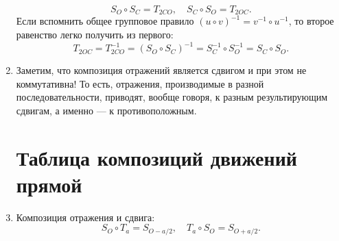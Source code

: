\begin{enumerate}
\begin{equation}\label{SOSC}
S_O\circ S_C=T_{2CO},\quad S_C\circ S_O=T_{2OC}.
\end{equation}
Если вспомнить общее групповое правило $(u\circ v)^{-1} = v^{-1}\circ u^{-1}$, то второе равенство легко получить из первого:
$$
T_{2OC} = T_{2CO}^{-1} = (S_O\circ S_C)^{-1} = S_C^{-1}\circ S_O^{-1}=S_C\circ S_O.
$$
\item Заметим, что композиция отражений является сдвигом и при этом не коммутативна! То есть, отражения, производимые в разной последовательности, приводят, вообще говоря, к разным результирующим сдвигам, а именно --- к противоположным.



\section{Таблица композиций движений прямой}




\item Композиция отражения и сдвига:
\begin{equation}\label{SOTa}
S_O\circ T_a = S_{O-a/2},\quad T_a\circ S_O = S_{O+a/2}.
\end{equation}


\end{enumerate}
